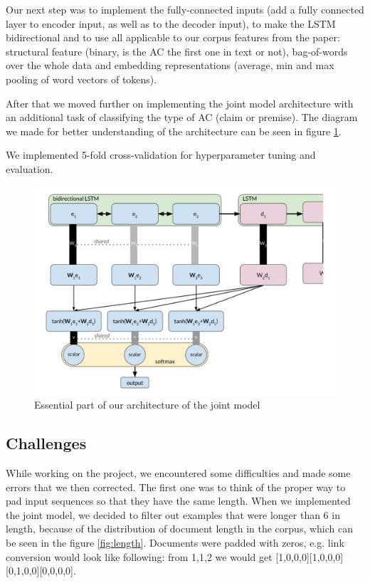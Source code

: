 \documentclass[onecolumn]{article}
\begin{document}
Our next step was to implement the fully-connected inputs (add a fully connected layer to encoder input,
as well as to the decoder input), to make the LSTM bidirectional and to use all applicable to our corpus features from the paper: structural feature 
(binary, is the AC the first one in text or not), bag-of-words over the whole data and embedding representations (average, min and max pooling
of word vectors of tokens). 

After that we moved further on implementing the joint model architecture with an additional task of classifying the type of AC (claim or premise). 
The diagram we made for better understanding of the architecture can be seen in figure \ref{fig:our-model}.

We implemented 5-fold cross-validation for hyperparameter tuning and evaluation.
\begin{figure}[h]
    \centering
    \includegraphics[width=0.8\linewidth]{fig/architecture.png}
    \caption{Essential part of our architecture of the joint model}
    \label{fig:our-model}
        \end{figure}

\subsection{Challenges}
While working on the project, we encountered some difficulties and made some errors that we then corrected. The first one 
was to think of the proper way to pad input sequences so that they have the same length. When we implemented the joint model, 
we decided to filter out examples that were longer than 6 in length, because of the distribution of document length in the corpus, which
can be seen in the figure \ref{fig:length}. Documents were padded with zeros, e.g. link conversion would look like following: 
from 1,1,2 we would get [1,0,0,0][1,0,0,0][0,1,0,0][0,0,0,0].
\end{document}
